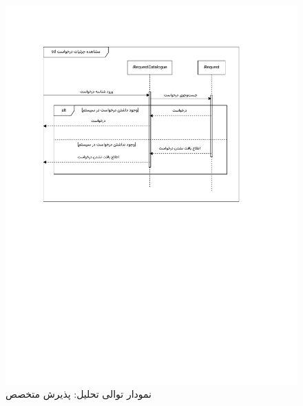 \begin{figure}[ht!]
	\centering
	\includegraphics[scale=0.8, page=5]{figs/OOD-Sequence-2.pdf}
	\caption{نمودار توالی تحلیل: پذیرش متخصص}
\end{figure}
\FloatBarrier
\newpage


